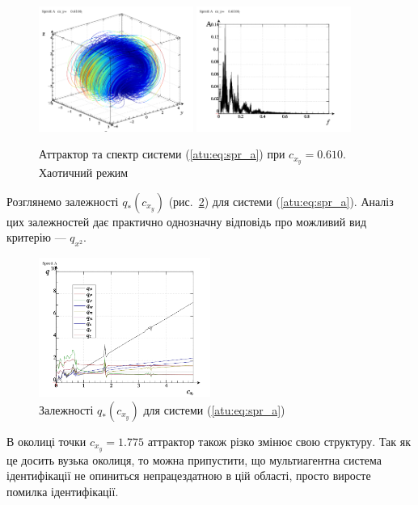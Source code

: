 \documentclass[a4paper,13pt]{atuaref}
\begin{document}
\begin{figure}[htb!]
\centerline{
  \includegraphics[width=0.45\textwidth]{p5/p/cha/spr_a/sprott_a-p_xyz_cx_y=0x610.png}
  \includegraphics[width=0.45\textwidth]{p5/p/cha/spr_a/sprott_a_f-p_f_cx_y=0x610.png}
}
\caption{Аттрактор та спектр системи (\ref{atu:eq:spr_a}) при $ c_{x_y} =0.610 $.
  Хаотичний режим
}
\label{atu:f:spr_a_p_0610}
\end{figure}


Розглянемо залежності $q_{*}(c_{x_y}) $ (рис.~\ref{atu:f:spr_a_q})
для системи (\ref{atu:eq:spr_a}). Аналіз цих залежностей дає практично
однозначну відповідь про можливий вид критерію --- $ q_{x^2} $.


\begin{figure}[htb!]
\centerline{
  \includegraphics[width=0.50\textwidth]{p5/p/cha/spr_a/sprott_a_q-p_c_x_y.png}
}
\caption{Залежності $q_{*}(c_{x_y})$ для системи (\ref{atu:eq:spr_a}) }
\label{atu:f:spr_a_q}
\end{figure}

В околиці точки $ c_ {x_y} = 1.775 $ аттрактор також різко змінює свою
структуру. Так як це досить вузька околиця, то можна припустити, що
мультиагентна система ідентифікації не опиниться непрацездатною в цій області,
просто виросте помилка ідентифікації.
\end{document}
